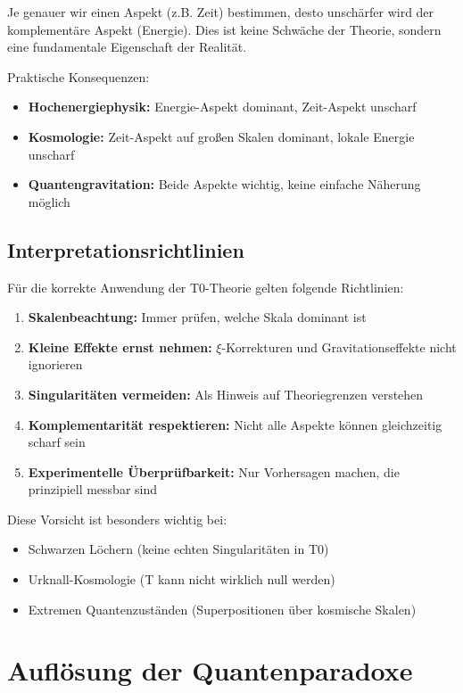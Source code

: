 	Je genauer wir einen Aspekt (z.B. Zeit) bestimmen, desto unschärfer wird der komplementäre Aspekt (Energie). Dies ist keine Schwäche der Theorie, sondern eine fundamentale Eigenschaft der Realität.
	
	Praktische Konsequenzen:
	\begin{itemize}
		\item \textbf{Hochenergiephysik:} Energie-Aspekt dominant, Zeit-Aspekt unscharf
		\item \textbf{Kosmologie:} Zeit-Aspekt auf großen Skalen dominant, lokale Energie unscharf
		\item \textbf{Quantengravitation:} Beide Aspekte wichtig, keine einfache Näherung möglich
	\end{itemize}
	
	\subsection{Interpretationsrichtlinien}
	
	Für die korrekte Anwendung der T0-Theorie gelten folgende Richtlinien:
	
	\begin{enumerate}
		\item \textbf{Skalenbeachtung:} Immer prüfen, welche Skala dominant ist
		\item \textbf{Kleine Effekte ernst nehmen:} $\xi$-Korrekturen und Gravitationseffekte nicht ignorieren
		\item \textbf{Singularitäten vermeiden:} Als Hinweis auf Theoriegrenzen verstehen
		\item \textbf{Komplementarität respektieren:} Nicht alle Aspekte können gleichzeitig scharf sein
		\item \textbf{Experimentelle Überprüfbarkeit:} Nur Vorhersagen machen, die prinzipiell messbar sind
	\end{enumerate}
	
	Diese Vorsicht ist besonders wichtig bei:
	\begin{itemize}
		\item Schwarzen Löchern (keine echten Singularitäten in T0)
		\item Urknall-Kosmologie (T kann nicht wirklich null werden)
		\item Extremen Quantenzuständen (Superpositionen über kosmische Skalen)
	\end{itemize}
	
	\section{Auflösung der Quantenparadoxe}
	
